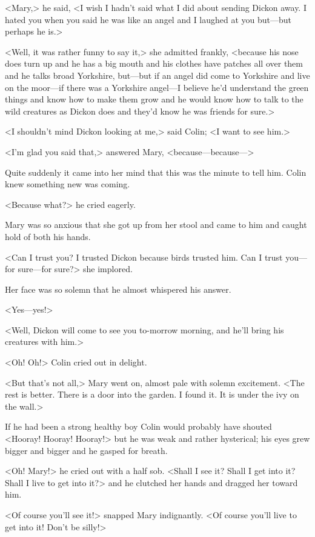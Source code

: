 <Mary,> he said, <I wish I hadn't said what I did about sending Dickon away. I hated you when you said he was like an angel and I laughed at you but—but perhaps he is.>

<Well, it was rather funny to say it,> she admitted frankly, <because his nose does turn up and he has a big mouth and his clothes have patches all over them and he talks broad Yorkshire, but—but if an angel did come to Yorkshire and live on the moor—if there was a Yorkshire angel—I believe he'd understand the green things and know how to make them grow and he would know how to talk to the wild creatures as Dickon does and they'd know he was friends for sure.>

<I shouldn't mind Dickon looking at me,> said Colin; <I want to see him.>

<I'm glad you said that,> answered Mary, <because—because—>

Quite suddenly it came into her mind that this was the minute to tell him. Colin knew something new was coming.

<Because what?> he cried eagerly.

Mary was so anxious that she got up from her stool and came to him and caught hold of both his hands.

<Can I trust you? I trusted Dickon because birds trusted him. Can I trust you—for sure—for sure?> she implored.

Her face was so solemn that he almost whispered his answer.

<Yes—yes!>

<Well, Dickon will come to see you to-morrow morning, and he'll bring his creatures with him.>

<Oh! Oh!> Colin cried out in delight.

<But that's not all,> Mary went on, almost pale with solemn excitement. <The rest is better. There is a door into the garden. I found it. It is under the ivy on the wall.>

If he had been a strong healthy boy Colin would probably have shouted <Hooray! Hooray! Hooray!> but he was weak and rather hysterical; his eyes grew bigger and bigger and he gasped for breath.

<Oh! Mary!> he cried out with a half sob. <Shall I see it? Shall I get into it? Shall I live to get into it?> and he clutched her hands and dragged her toward him.

<Of course you'll see it!> snapped Mary indignantly. <Of course you'll live to get into it! Don't be silly!>


